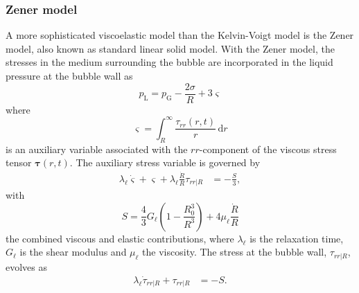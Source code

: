 \subsubsection{Zener model}

A more sophisticated viscoelastic model than the Kelvin-Voigt model is the Zener model, also known as standard linear solid model. With the Zener model, the stresses in the medium surrounding the bubble are incorporated in the liquid pressure at the bubble wall as \citep{Hua2013}
\begin{equation}
     p_\text{L} = p_\text{G} - \frac{2 \sigma}{R} + 3 \varsigma \label{eq:pL_Zener}
\end{equation}
where
\begin{equation}
    \varsigma= \int_R^\infty \frac{\tau_{rr}(r,t)}{r} \, \mathrm{d}r
\end{equation}
is an auxiliary variable associated with the $rr$-component of the viscous stress tensor $\boldsymbol{\tau}(r,t)$. The auxiliary stress variable is governed by
\begin{align}
    \lambda_\ell \dot{\varsigma} + \varsigma +\lambda_\ell \frac{\dot{R}}{R} {\tau}_{rr|R} &= - \frac{S}{3},  \label{eq:ode_varsigma}
\end{align}
with
\begin{equation}
    S = \frac{4}{3} G_\ell \left( 1- \frac{R_0^3}{R^3} \right) + 4 \mu_\ell \frac{\dot{R}}{R}
\end{equation}
the combined viscous and elastic contributions, where $\lambda_\ell$ is the relaxation time, $G_\ell$ is the shear modulus and $\mu_\ell$ the viscosity. The stress at the bubble wall, ${\tau}_{rr|R}$, evolves as
\begin{align}
    \lambda_\ell \dot{\tau}_{rr|R} + {\tau}_{rr|R} &= -S. \label{eq:ode_tau}
\end{align}

